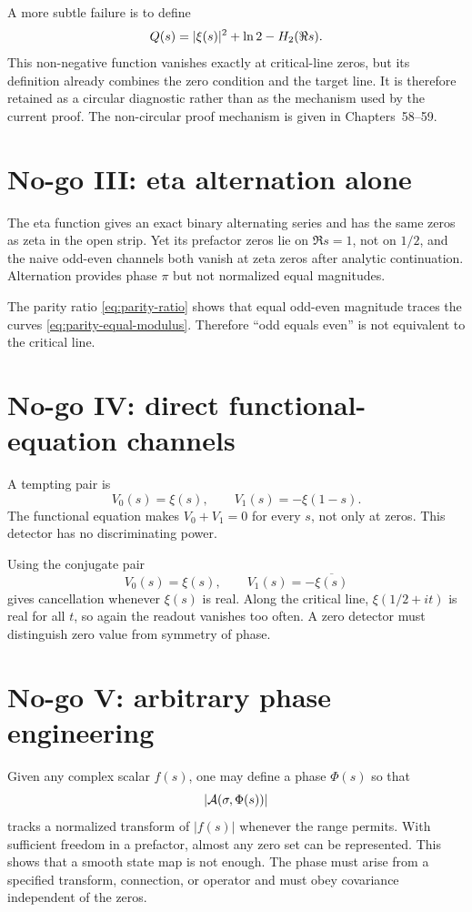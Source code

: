 A more subtle failure is to define
\[
 Q(s)=|\xi(s)|^2+\ln2-H_2(\Re s).
\]
This non-negative function vanishes exactly at critical-line zeros, but its definition already combines the zero condition and the target line. It is therefore retained as a circular diagnostic rather than as the mechanism used by the current proof. The non-circular proof mechanism is given in Chapters~58--59.

\section{No-go III: eta alternation alone}

The eta function gives an exact binary alternating series and has the same zeros as zeta in the open strip. Yet its prefactor zeros lie on $\Re s=1$, not on $1/2$, and the naive odd-even channels both vanish at zeta zeros after analytic continuation. Alternation provides phase $\pi$ but not normalized equal magnitudes.

The parity ratio \cref{eq:parity-ratio} shows that equal odd-even magnitude traces the curves \cref{eq:parity-equal-modulus}. Therefore ``odd equals even'' is not equivalent to the critical line.

\section{No-go IV: direct functional-equation channels}

A tempting pair is
\[
 V_0(s)=\xi(s),\qquad V_1(s)=-\xi(1-s).
\]
The functional equation makes $V_0+V_1=0$ for every $s$, not only at zeros. This detector has no discriminating power.

Using the conjugate pair
\[
 V_0(s)=\xi(s),\qquad V_1(s)=-\overline{\xi(s)}
\]
gives cancellation whenever $\xi(s)$ is real. Along the critical line, $\xi(1/2+it)$ is real for all $t$, so again the readout vanishes too often. A zero detector must distinguish zero value from symmetry of phase.

\section{No-go V: arbitrary phase engineering}

Given any complex scalar $f(s)$, one may define a phase $\Phi(s)$ so that
\[
 |\mathcal{A}(\sigma,\Phi(s))|
\]
tracks a normalized transform of $|f(s)|$ whenever the range permits. With sufficient freedom in a prefactor, almost any zero set can be represented. This shows that a smooth state map is not enough. The phase must arise from a specified transform, connection, or operator and must obey covariance independent of the zeros.

